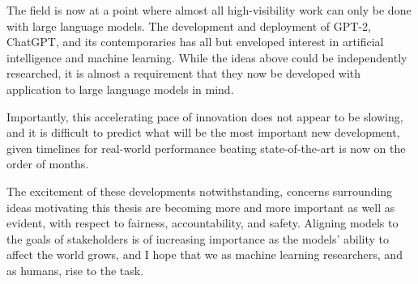 The field is now at a point
where almost all high-visibility
work can only be done
with large language models.
The development and deployment
of GPT-2, ChatGPT, and its contemporaries
has all but enveloped interest
in artificial intelligence and machine learning.
While the ideas above could be independently
researched,
it is almost a requirement that they now 
be developed with application to large
language models in mind.

Importantly, this accelerating pace
of innovation does not appear to be slowing,
and it is difficult to predict
what will be the most important
new development, given timelines
for real-world performance beating
state-of-the-art is now on the order of months.

The excitement of these developments notwithstanding,
concerns surrounding ideas motivating this thesis
are becoming more and more important as well
as evident, with respect to fairness,
accountability, and safety.
Aligning models to the goals of stakeholders
is of increasing importance as the models'
ability to affect the world grows,
and I hope that we as machine learning
researchers, and as humans, rise to the task.